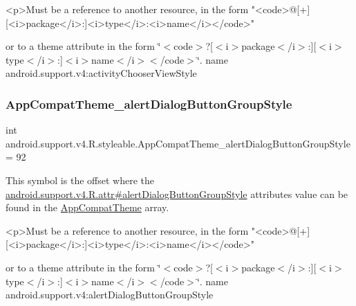 \begin{DoxyVerb}      <p>Must be a reference to another resource, in the form "<code>@[+][<i>package</i>:]<i>type</i>:<i>name</i></code>"
\end{DoxyVerb}
 or to a theme attribute in the form \char`\"{}$<$code$>$?\mbox{[}$<$i$>$package$<$/i$>$\+:\mbox{]}\mbox{[}$<$i$>$type$<$/i$>$\+:\mbox{]}$<$i$>$name$<$/i$>$$<$/code$>$\char`\"{}.  name android.\+support.\+v4\+:activity\+Chooser\+View\+Style \mbox{\label{classandroid_1_1support_1_1v4_1_1R_1_1styleable_a14ef4f0115ef99be0cd37f57ee57210e}} 
\subsubsection{\texorpdfstring{App\+Compat\+Theme\+\_\+alert\+Dialog\+Button\+Group\+Style}{AppCompatTheme\_alertDialogButtonGroupStyle}}
{\footnotesize\ttfamily int android.\+support.\+v4.\+R.\+styleable.\+App\+Compat\+Theme\+\_\+alert\+Dialog\+Button\+Group\+Style = 92\hspace{0.3cm}{\ttfamily [static]}}

This symbol is the offset where the \hyperlink{classandroid_1_1support_1_1v4_1_1R_1_1attr_aff1b8dace5d14ac0be03f8d0e93f1646}{android.\+support.\+v4.\+R.\+attr\#alert\+Dialog\+Button\+Group\+Style} attribute\textquotesingle{}s value can be found in the \hyperlink{classandroid_1_1support_1_1v4_1_1R_1_1styleable_ac07ebbe62ed977f6dcaadc6397840ace}{App\+Compat\+Theme} array.

\begin{DoxyVerb}      <p>Must be a reference to another resource, in the form "<code>@[+][<i>package</i>:]<i>type</i>:<i>name</i></code>"
\end{DoxyVerb}
 or to a theme attribute in the form \char`\"{}$<$code$>$?\mbox{[}$<$i$>$package$<$/i$>$\+:\mbox{]}\mbox{[}$<$i$>$type$<$/i$>$\+:\mbox{]}$<$i$>$name$<$/i$>$$<$/code$>$\char`\"{}.  name android.\+support.\+v4\+:alert\+Dialog\+Button\+Group\+Style \mbox{\label{classandroid_1_1support_1_1v4_1_1R_1_1styleable_af89ac865778b38e2eee143370582e60a}} 
